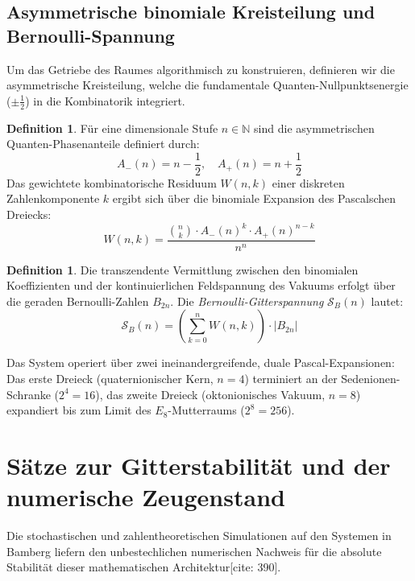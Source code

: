\documentclass[11pt,a4paper]{article}
\theoremstyle{definition}
\newtheorem{definition}[theorem]{Definition}
\begin{document}
	\subsection{Asymmetrische binomiale Kreisteilung und Bernoulli-Spannung}
	Um das Getriebe des Raumes algorithmisch zu konstruieren, definieren wir die asymmetrische Kreisteilung, welche die fundamentale Quanten-Nullpunktsenergie ($\pm \frac{1}{2}$) in die Kombinatorik integriert.
	
	\begin{definition}
		Für eine dimensionale Stufe $n \in \mathbb{N}$ sind die asymmetrischen Quanten-Phasenanteile definiert durch:
		\begin{equation}
			A_-(n) = n - \frac{1}{2}, \quad A_+(n) = n + \frac{1}{2}
		\end{equation}
		Das gewichtete kombinatorische Residuum $W(n,k)$ einer diskreten Zahlenkomponente $k$ ergibt sich über die binomiale Expansion des Pascalschen Dreiecks:
		\begin{equation}
			W(n,k) = \frac{\binom{n}{k} \cdot A_-(n)^k \cdot A_+(n)^{n-k}}{n^n}
		\end{equation}
	\end{definition}
	
	\begin{definition}
		Die transzendente Vermittlung zwischen den binomialen Koeffizienten und der kontinuierlichen Feldspannung des Vakuums erfolgt über die geraden Bernoulli-Zahlen $B_{2n}$. Die \textit{Bernoulli-Gitterspannung} $\mathcal{S}_B(n)$ lautet:
		\begin{equation}
			\mathcal{S}_B(n) = \left( \sum_{k=0}^n W(n,k) \right) \cdot |B_{2n}|
		\end{equation}
	\end{definition}
	
	Das System operiert über zwei ineinandergreifende, duale Pascal-Expansionen: Das erste Dreieck (quaternionischer Kern, $n=4$) terminiert an der Sedenionen-Schranke ($2^4=16$), das zweite Dreieck (oktonionisches Vakuum, $n=8$) expandiert bis zum Limit des $E_8$-Mutterraums ($2^8=256$).
	
	\section{Sätze zur Gitterstabilität und der numerische Zeugenstand}
	
	Die stochastischen und zahlentheoretischen Simulationen auf den Systemen in Bamberg liefern den unbestechlichen numerischen Nachweis für die absolute Stabilität dieser mathematischen Architektur[cite: 390].
	
\end{document}
